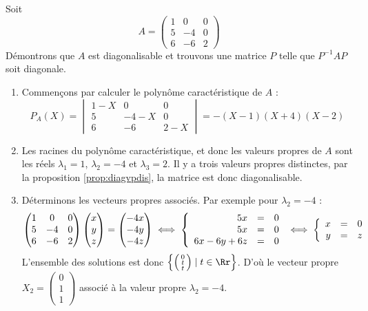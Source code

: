 \documentclass[11pt, class=report,crop=false]{standalone}
\begin{document}
\begin{exemple}
Soit 
$$A=
\begin{pmatrix}
1 & 0 & 0 \\
5 & -4 & 0 \\
6 & -6 & 2
\end{pmatrix}$$
Démontrons que $A$ est diagonalisable et trouvons une matrice $P$ telle que $P^{-1}AP$ soit diagonale.


\begin{enumerate}
  \item Commençons par calculer le polynôme caractéristique de $A$ :
$$P_A(X)=\begin{vmatrix}
1-X & 0 & 0 \\
5 & -4-X & 0 \\
6 & -6 & 2-X
\end{vmatrix}
=-(X-1)(X+4)(X-2)$$


  \item Les racines du polynôme caractéristique, et donc les valeurs propres de $A$ sont les réels 
  $\lambda_1 = 1$, $\lambda_2 = -4$ et $\lambda_3 = 2$. Il y a trois valeurs propres distinctes, par la proposition \ref{prop:diagvpdis}, la matrice est donc diagonalisable.
  
  \item  Déterminons les vecteurs propres associés.
Par exemple pour $\lambda_2 = -4$ :
$$\begin{pmatrix}
1 & 0 & 0 \\
5 & -4 & 0 \\
6 & -6 & 2
\cr\end{pmatrix}\begin{pmatrix}x\cr y \cr z\end{pmatrix}=
\begin{pmatrix}-4x\cr -4y \cr -4z\end{pmatrix}
\iff 
\left\{ 
\begin{array}{rcl}
5x &=& 0 \\
5x &=& 0 \\
6x-6y+6z &=& 0 \\ 
\end{array}
\right.
\iff 
\left\{ 
\begin{array}{rcl}
x &=& 0 \\
y &=& z \\ 
\end{array}
\right.$$
L'ensemble des solutions est donc 
$\left\{ \left(\begin{smallmatrix}0\\t\\t\end{smallmatrix}\right) \mid t \in \Rr \right\}$.
D'où le vecteur propre $X_2=\left(\begin{smallmatrix}0\\1\\1\end{smallmatrix}\right)$ associé à la valeur propre $\lambda_2=-4$.   
  

\end{enumerate}
\end{exemple}
\end{document}
